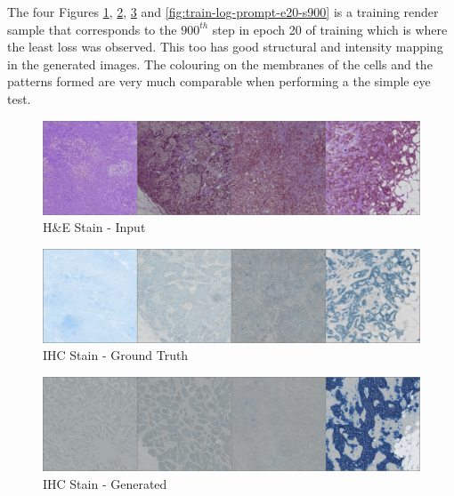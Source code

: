 The four Figures \ref{fig:train-log-source-e20-s900}, \ref{fig:train-log-target-e20-s900}, \ref{fig:train-log-sample-e20-s900} and \ref{fig:train-log-prompt-e20-s900} is a training render sample that corresponds to the $900^{th}$ step in epoch 20 of training which is where the least loss was observed. This too has good structural and intensity mapping in the generated images. The colouring on the membranes of the cells and the patterns formed are very much comparable when performing a the simple eye test.
\begin{figure}[h]
    \centering
    \includegraphics[width=1\linewidth]{5_Results/figures/control_gs-020380_e-000020_b-000900.png}
    \caption[Input H\&E images for train log at e=20, steps=900]{H\&E Stain - Input}
    \label{fig:train-log-source-e20-s900}
\end{figure}
\begin{figure}[h]
    \centering
    \includegraphics[width=1\linewidth]{5_Results/figures/reconstruction_gs-020380_e-000020_b-000900.png}
    \caption[Target IHC images for train log at e=20, steps=900]{IHC Stain - Ground Truth}
    \label{fig:train-log-target-e20-s900}
\end{figure}
\begin{figure}[h]
    \centering
    \includegraphics[width=1\linewidth]{5_Results/figures/samples_cfg_scale_9.00_gs-020380_e-000020_b-000900.png}
    \caption[Generated IHC images for train log at e=20, steps=900]{IHC Stain - Generated}
    \label{fig:train-log-sample-e20-s900}
\end{figure}
